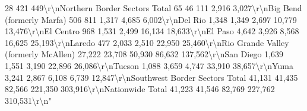 \documentclass[
  12pt,
]{book}
\newenvironment{Shaded}{\begin{snugshade}}{\end{snugshade}}
\begin{document}
\begin{Shaded}
\begin{Highlighting}[]
              28              421               449\textbackslash{}r\textbackslash{}nNorthern Border Sectors Total                    65                       46                  111             2,916             3,027\textbackslash{}r\textbackslash{}nBig Bend (formerly Marfa)                       506                      811                 1,317           4,685              6,002\textbackslash{}r\textbackslash{}nDel Rio                                        1,348                    1,349                2,697           10,779             13,476\textbackslash{}r\textbackslash{}nEl Centro                                       968                     1,531                2,499           16,134             18,633\textbackslash{}r\textbackslash{}nEl Paso                                        4,642                    3,926                8,568           16,625             25,193\textbackslash{}r\textbackslash{}nLaredo                                          477                     2,033                2,510           22,950             25,460\textbackslash{}r\textbackslash{}nRio Grande Valley (formerly McAllen)          27,222                   23,708                50,930          86,632            137,562\textbackslash{}r\textbackslash{}nSan Diego                                      1,639                    1,551                3,190           22,896             26,086\textbackslash{}r\textbackslash{}nTucson                                         1,088                    3,659                4,747           33,910             38,657\textbackslash{}r\textbackslash{}nYuma                                           3,241                    2,867                6,108           6,739              12,847\textbackslash{}r\textbackslash{}nSouthwest Border Sectors Total                41,131                   41,435                82,566         221,350            303,916\textbackslash{}r\textbackslash{}nNationwide Total                              41,223                   41,546                82,769         227,762            310,531\textbackslash{}r\textbackslash{}n"                                                                                                                                                                                                                                                                                                                                                                                                                                                                                                                                                                                                                                                                                                                                                                                                                                                                                                                                                                                                                                                                                                                                                                                                                                              
\end{Highlighting}
\end{Shaded}
\end{document}

